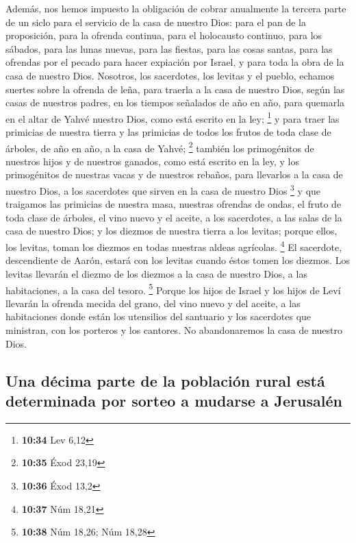  Además, nos hemos impuesto la obligación de cobrar
anualmente la tercera parte de un siclo para el servicio de la casa de
nuestro Dios:  para el pan de la proposición, para la
ofrenda continua, para el holocausto continuo, para los sábados, para
las lunas nuevas, para las fiestas, para las cosas santas, para las
ofrendas por el pecado para hacer expiación por Israel, y para toda la
obra de la casa de nuestro Dios.  Nosotros, los
sacerdotes, los levitas y el pueblo, echamos suertes sobre la ofrenda de
leña, para traerla a la casa de nuestro Dios, según las casas de
nuestros padres, en los tiempos señalados de año en año, para quemarla
en el altar de Yahvé nuestro Dios, como está escrito en la ley;
\footnote{\textbf{10:34} Lev 6,12}  y para traer las
primicias de nuestra tierra y las primicias de todos los frutos de toda
clase de árboles, de año en año, a la casa de Yahvé; \footnote{\textbf{10:35}
  Éxod 23,19}  también los primogénitos de nuestros hijos
y de nuestros ganados, como está escrito en la ley, y los primogénitos
de nuestras vacas y de nuestros rebaños, para llevarlos a la casa de
nuestro Dios, a los sacerdotes que sirven en la casa de nuestro Dios
\footnote{\textbf{10:36} Éxod 13,2}  y que traigamos las
primicias de nuestra masa, nuestras ofrendas de ondas, el fruto de toda
clase de árboles, el vino nuevo y el aceite, a los sacerdotes, a las
salas de la casa de nuestro Dios; y los diezmos de nuestra tierra a los
levitas; porque ellos, los levitas, toman los diezmos en todas nuestras
aldeas agrícolas. \footnote{\textbf{10:37} Núm 18,21}  El
sacerdote, descendiente de Aarón, estará con los levitas cuando éstos
tomen los diezmos. Los levitas llevarán el diezmo de los diezmos a la
casa de nuestro Dios, a las habitaciones, a la casa del tesoro.
\footnote{\textbf{10:38} Núm 18,26; Núm 18,28}  Porque
los hijos de Israel y los hijos de Leví llevarán la ofrenda mecida del
grano, del vino nuevo y del aceite, a las habitaciones donde están los
utensilios del santuario y los sacerdotes que ministran, con los
porteros y los cantores. No abandonaremos la casa de nuestro Dios.

\hypertarget{una-duxe9cima-parte-de-la-poblaciuxf3n-rural-estuxe1-determinada-por-sorteo-a-mudarse-a-jerusaluxe9n}{%
\subsection{Una décima parte de la población rural está determinada por
sorteo a mudarse a
Jerusalén}\label{una-duxe9cima-parte-de-la-poblaciuxf3n-rural-estuxe1-determinada-por-sorteo-a-mudarse-a-jerusaluxe9n}}

